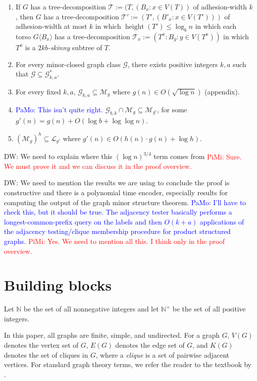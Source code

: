 \documentclass{patmorin}
\DeclareMathOperator{\height}{height}
\newcommand{\torso}[2]{{#1}\langle{#2}\rangle}
\renewcommand{\le}{\leqslant}
\newcommand{\david}[1]{{\color{orange} DW: #1}}
\newcommand{\pat}[1]{\textcolor{Blue}{PaMo: #1}}
\newcommand{\piotr}[1]{\textcolor{red}{PiMi: #1}}
\newcommand{\defin}[1]{\emph{\textcolor{brightmaroon}{#1}}}
\newcommand{\NN}{\mathbb{N}}
\begin{document}
\begin{enumerate}[label=(\arabic*)]
    \item If $G$ has a tree-decomposition $\mathcal{T}:=(T, (B_x:x\in V(T))$ of adhesion-width $k$, then $G$ has a tree-decomposition $\mathcal{T}':=(T',(B'_x:x\in V(T')))$ of adhesion-width at most $k$ in which $\height(T')\le\log_{b} n$ in which each torso $\torso{G}{B_x}$ has a tree-decomposition $\mathcal{T}_x:=(T^x:B_y:y\in V(T^x))$ in which $T^x$ is a \defin{$2kb$-skinny} subtree of $T$.
    \item For every minor-closed graph class $\mathcal{G}$, there exists positive integers $k,a$ such that $\mathcal{G}\subseteq \mathcal{G}^*_{k,a}$.
    \item For every fixed $k,a$, $\mathcal{G}_{k,a}\subseteq\mathcal{M}_g$ where $g(n)\in O(\sqrt{\log n})$ (appendix).
    \item\label{skinny_tree} \pat{This isn't quite right.}  $\mathcal{G}_{b,k}\cap\mathcal{M}_g\subseteq \mathcal{M}_{g'}$, for some $g'(n)=g(n)+O(\log b+\log\log n)$.
    \item $(\mathcal{M}_g)^h\subseteq \mathcal{L}_{g'}$ where $g'(n)\in O(h(n)\cdot g(n)+\log h)$.
\end{enumerate}



\david{We need to explain where this $(\log n)^{3/4}$ term comes from}
\piotr{Sure. We must prove it and we can discuss it in the proof overview.}

\david{We need to mention the results we are using to conclude the proof is constructive and there is a polynomial time encoder, especially results for computing the output of the graph minor structure theorem.}
\pat{I'll have to check this, but it should be true.  The adjacency tester basically performs a longest-common-prefix query on the labels and then $O(k+a)$ applications of the adjacency testing/clique membership procedure for product structured graphs.}
\piotr{Yes. We need to mention all this. I think only in the proof overview.}




  \section{Building blocks}

Let \defin{$\NN$} be the set of all nonnegative integers and let \defin{$\NN^+$} be the set of all positive integers.

  In this paper, all graphs are finite, simple, and undirected.  For a graph $G$, \defin{$V(G)$} denotes the vertex set of $G$, \defin{$E(G)$} denotes the edge set of $G$, and \defin{$K(G)$} denotes the set of cliques in $G$, where a \defin{clique} is a set of pairwise adjacent vertices. For standard graph theory terms, we refer the reader to the textbook by \citet{diestel:graph}.
\end{document}
